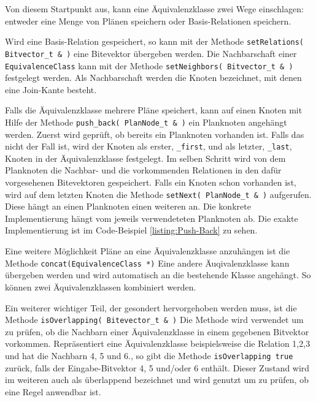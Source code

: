 Von diesem Startpunkt aus, kann eine Äquivalenzklasse zwei Wege einschlagen: entweder eine Menge von Plänen speichern oder Basis-Relationen speichern. 

Wird eine Basis-Relation gespeichert, so kann mit der Methode \texttt{setRelations( Bitvector\_t \& )} eine Bitevektor übergeben werden. Die Nachbarschaft einer \texttt{Equi\-valence\-Class} kann mit der Methode \texttt{set\-Neighbors( Bitvector\_t \& )} festgelegt werden. Als Nachbarschaft werden die Knoten bezeichnet, mit denen eine Join-Kante besteht.




Falls die Äquivalenzklasse mehrere Pläne speichert, kann auf einen Knoten mit Hilfe der Methode \texttt{push\_back( PlanNode\_t \& )} ein Planknoten angehängt werden. Zuerst wird geprüft, ob bereits ein Planknoten vorhanden ist. Falls das nicht der Fall ist, wird der Knoten als erster, \texttt{\_first}, und als letzter, \texttt{\_last}, Knoten in der Äquivalenzklasse festgelegt. Im selben Schritt wird von dem Planknoten die Nachbar- und die vorkommenden Relationen in den dafür vorgesehenen Bitevektoren gespeichert. Falls ein Knoten schon vorhanden ist, wird auf dem letzten Knoten die Methode \texttt{setNext( PlanNode\_t \& )} aufgerufen. Diese hängt an einen Planknoten einen weiteren an. Die konkrete Implementierung hängt vom jeweils verwendeteten Planknoten ab. Die exakte Implementierung ist im Code-Beispiel \ref{listing:Push-Back} zu sehen.



Eine weitere Möglichkeit Pläne an eine Äquivalenzklasse anzuhängen ist die Methode \texttt{concat(EquivalenceClass *)} Eine andere Äuqivalenzklasse kann übergeben werden und wird automatisch an die bestehende Klasse angehängt. So können zwei Äquivalenzklassen kombiniert werden.



Ein weiterer wichtiger Teil, der gesondert hervorgehoben werden muss, ist die Methode \texttt{isOverlapping( Bitevector\_t \& )} Die Methode wird  verwendet um zu prüfen, ob die Nachbarn einer Äquivalenzklasse in einem gegebenen Bitvektor vorkommen. Repräsentiert eine Äquivalenzklasse beispielsweise die Relation 1,2,3 und hat die Nachbarn 4, 5 und 6., so gibt die Methode \texttt{isOverlapping true} zurück, falls der Eingabe-Bitvektor 4, 5 und/oder 6 enthält. Dieser Zustand wird im weiteren auch als überlappend bezeichnet und wird genutzt um zu prüfen, ob eine Regel anwendbar ist.

